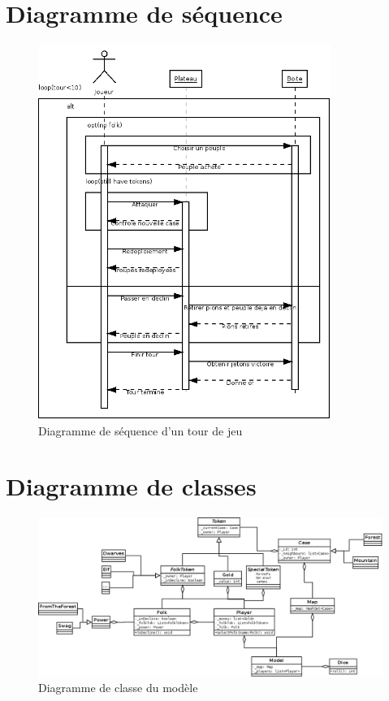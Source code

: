 \documentclass[a4paper]{report}
\begin{document}
\section{Diagramme de séquence}
\begin{figure}[H]
    \begin{center}
        \includegraphics[width=0.85\textwidth]{sequence.png}
        \caption{Diagramme de séquence d'un tour de jeu}
    \end{center}
\end{figure}
\section{Diagramme de classes}
\begin{figure}[H]
    \begin{center}
        \includegraphics[width=0.85\textheight,angle=90]{classe.png}
        \caption{Diagramme de classe du modèle}
    \end{center}
\end{figure}
\end{document}
